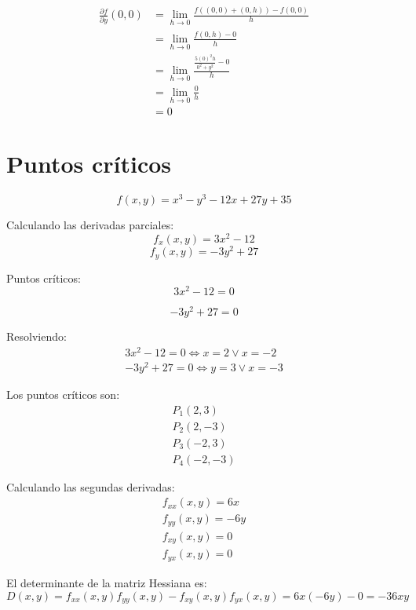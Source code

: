 \documentclass{article}
\begin{document}
\begin{itemize}
    \begin{align*}
      \frac{\partial f}{\partial y}(0, 0) &= \lim_{h \to 0} \frac{f((0, 0) + (0, h)) - f(0, 0)}{h} \\
      &= \lim_{h \to 0} \frac{f(0, h) - 0}{h} \\
      &= \lim_{h \to 0} \frac{\frac{5(0)^2 h}{0^2 + y^2} - 0}{h} \\
      &= \lim_{h \to 0} \frac{0}{h} \\
      &= 0
    \end{align*}
\end{itemize}

\section{Puntos críticos}

\[
f(x, y) = x^3 - y^3 - 12x + 27y + 35
\]

Calculando las derivadas parciales:
\[
f_x(x, y) = 3x^2 - 12
\]
\[
f_y(x, y) = -3y^2 + 27
\]

Puntos críticos:
\begin{equation}
  3x^2 - 12 = 0
\end{equation}

\begin{equation}
  -3y^2 + 27 = 0
\end{equation} 

Resolviendo:
\begin{align*}
  3x^2 - 12 = 0 \iff x = 2 \vee x = -2 \\
  -3y^2 + 27 = 0 \iff y = 3 \vee x = -3
\end{align*}

Los puntos críticos son:
\begin{align*}
  P_1(2, 3) \\
  P_2(2, -3) \\
  P_3(-2, 3) \\
  P_4(-2, -3)
\end{align*}

Calculando las segundas derivadas:
\begin{align*}
f_{xx}(x, y) = 6x \\
f_{yy}(x, y) = -6y \\
f_{xy}(x, y) = 0 \\
f_{yx}(x, y) = 0
\end{align*}

El determinante de la matriz Hessiana es:
\[
D(x, y) = f_{xx}(x, y)f_{yy}(x, y) - f_{xy}(x, y)f_{yx}(x, y) = 6x(-6y) - 0 = -36xy
\]
\end{document}
